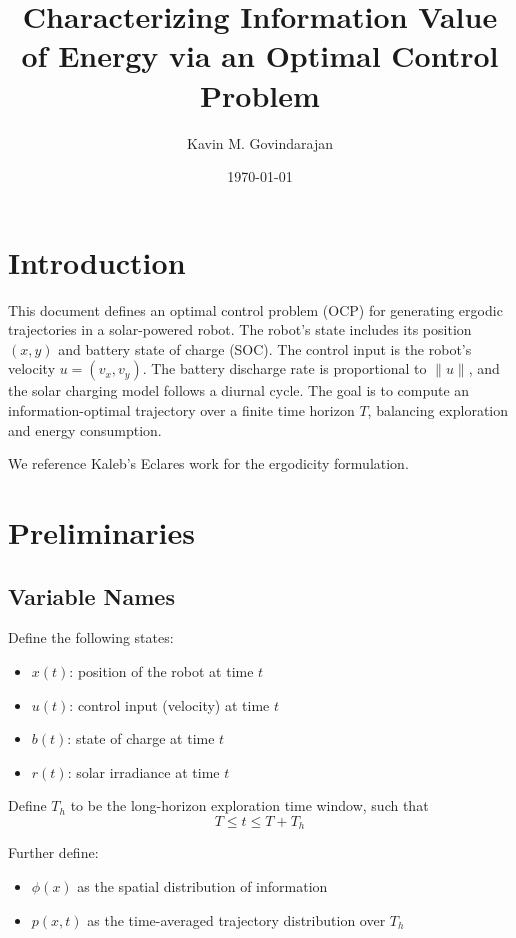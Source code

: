 \documentclass{article}
\title{Characterizing Information Value of Energy via an Optimal Control Problem}
\author{Kavin M. Govindarajan}
\date{\today}
\begin{document}
\maketitle

\section{Introduction}
This document defines an optimal control problem (OCP) for generating ergodic trajectories in a solar-powered robot. The robot's state includes its position $(x, y)$ and battery state of charge (SOC). The control input is the robot's velocity $u = (v_x, v_y)$. The battery discharge rate is proportional to $\|u\|$, and the solar charging model follows a diurnal cycle. The goal is to compute an information-optimal trajectory over a finite time horizon $T$, balancing exploration and energy consumption.

We reference Kaleb's Eclares work \cite{naveedEclaresEnergyAwareClarityDriven2024} for the ergodicity formulation.

\section{Preliminaries}
\subsection{Variable Names}
Define the following states:
\begin{itemize}
    \item $x(t)$: position of the robot at time $t$
    \item $u(t)$: control input (velocity) at time $t$
    \item $b(t)$: state of charge at time $t$
    \item $r(t)$: solar irradiance at time $t$
\end{itemize}

Define $T_h$ to be the long-horizon exploration time window, such that
\begin{equation}
    T \leq t \leq T + T_h
\end{equation}

Further define:
\begin{itemize}
    \item $\phi(x)$ as the spatial distribution of information
    \item $p(x,t)$ as the time-averaged trajectory distribution over $T_h$
\end{itemize}
\end{document}
